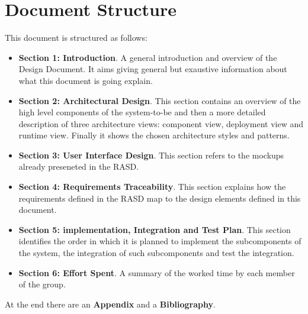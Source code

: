 \section{Document Structure}
This document is structured as follows:
\begin{itemize}
  \setlength{\itemindent}{-.4in}
  \item[] \textbf{Section 1: Introduction}. A general introduction and overview of the Design Document. It aims giving general but exaustive information about what this document is going explain.
  \item[] \textbf{Section 2: Architectural Design}. This section contains an overview of the high level components of the system-to-be and then a more detailed description of three architecture views: component view, deployment view and runtime view. Finally it shows the chosen architecture styles and patterns.
  \item[] \textbf{Section 3: User Interface Design}. This section refers to the mockups already preseneted in the RASD.
  \item[] \textbf{Section 4: Requirements Traceability}. This section explains how the requirements defined in the RASD map to the design elements defined in this document.
  \item[] \textbf{Section 5: implementation, Integration and Test Plan}. This section identifies the order in which it is planned to implement the subcomponents of the system, the integration of such subcomponents and test the integration.
  \item[] \textbf{Section 6: Effort Spent}. A summary of the worked time by each member of the group.
\end{itemize}
At the end there are an \textbf{Appendix} and a \textbf{Bibliography}.
